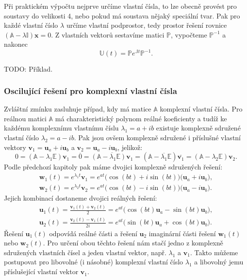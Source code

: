 \documentclass[a4paper, 12pt]{book}
\theoremstyle{definition}
\def\vc#1{\mathbf{\boldsymbol{#1}}}     %
\def\tn#1{{\mathbb{#1}}}    %
\def\close#1{\overline{#1}}
\def\todo#1{{\color{green}TODO:} #1}
\begin{document}
Při praktickém výpočtu nejprve určíme vlastní čísla, to lze obecně provést pro soustavy do velikosti 4, nebo pokud má soustava nějaký speciální tvar. 
Pak pro každé vlastní číslo $\lambda$ určíme vlastní podprostor, tedy prostor řešení rovnice $(\tn A -\lambda \tn I)\vc x= 0$. 
Z vlastních vektorů sestavíme matici $\tn P$, vypočteme $\tn P^{-1}$ a nakonec
\[
    \tn U(t) = \tn P e^{\tn J t} \tn P^{-1}.
\]

\todo{Příklad.}

\subsubsection{Oscilující řešení pro komplexní vlastní čísla}
Zvláštní zmínku zasluhuje případ, kdy má matice $\tn A$ komplexní vlastní čísla. Pro reálnou matici $\tn A$
má charakteristický polynom reálné koeficienty a tudíž ke každému komplexnímu vlastnímu číslu $\lambda_1=a+ib$
existuje komplexně sdružené vlastní číslo $\lambda_2=a-ib$. Pak jsou ovšem komplexně sdružené i příslušné vlastní vektory $\vc v_1=\vc u_a +i\vc u_b$ 
a $\vc v_2=\vc u_a -i\vc u_b$, jelikož:
\[
  0=(\tn A-\lambda_1 \tn E)\vc v_1=\close{0}=\close{(\tn A-\lambda_1 \tn E)\vc v_1}
  =(\tn A-\close{\lambda_1} \tn E)\close{\vc v_1}=(\tn A-\lambda_2 \tn E)\vc v_2.
\]
Podle předchozí kapitoly pak máme dvojici komplexně sdružených řešení:
\begin{align*}
  \vc w_1(t) = e^{\lambda_1 t} \vc v_1 = e^{at} \big(\cos(bt) + i\sin(bt) \big)\big( \vc u_a + i \vc u_b \big),\\
  \vc w_2(t) = e^{\lambda_2 t} \vc v_2 = e^{at} \big(\cos(bt) - i\sin(bt) \big)\big( \vc u_a - i \vc u_b \big).
\end{align*}
Jejich kombinací dostaneme dvojici reálných řešení:
\begin{align*}
 \vc u_1(t) = \frac{\vc v_1(t) + \vc v_2(t)}{2} = e^{at}\big( \cos(bt) \vc u_a - \sin(bt) \vc u_b \big),\\
 \vc u_2(t) = \frac{\vc v_2(t) - \vc v_1(t)}{2i} = e^{at}\big( \sin(bt) \vc u_a + \cos(bt) \vc u_b \big).
\end{align*}
Řešení $\vc u_1(t)$ odpovídá reálné části a řešení $\vc u_2$ imaginární části řešení $\vc w_1(t)$ nebo $\vc w_2(t)$.
Pro určení obou těchto řešení nám stačí jedno z komplexně sdružených vlastních čísel a jeden vlastní vektor, např. $\lambda_1$ a $\vc v_1$.
Takto můžeme postupovat pro libovolné (i násobné) komplexní vlastní číslo $\lambda_1$ a libovolný jemu příslušející vlastní vektor $\vc v_1$.
\end{document}

